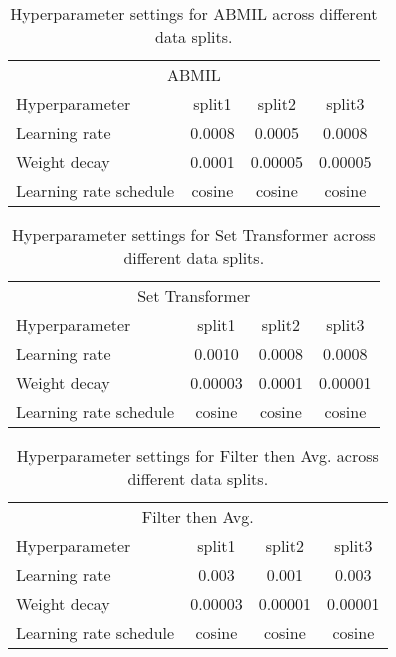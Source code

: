 \begin{table}[!htb]
\centering
\begin{tabular}{l|c|c|c}
\multicolumn{4}{c}{ABMIL} \\
Hyperparameter & split1 & split2 & split3 \\
\midrule
Learning rate & 0.0008 & 0.0005 & 0.0008 \\
Weight decay & 0.0001 & 0.00005 & 0.00005 \\
Learning rate schedule & cosine & cosine & cosine\\
\end{tabular}
\caption{Hyperparameter settings for ABMIL across different data splits.}
\label{tab:ABMIL_hyper}
\end{table}

\begin{table}[!htb]
\centering
\begin{tabular}{l|c|c|c}
\multicolumn{4}{c}{Set Transformer} \\
Hyperparameter & split1 & split2 & split3 \\
\midrule
Learning rate & 0.0010 & 0.0008 & 0.0008 \\
Weight decay & 0.00003 & 0.0001 & 0.00001 \\
Learning rate schedule & cosine & cosine & cosine\\
\end{tabular}
\caption{Hyperparameter settings for Set Transformer across different data splits.}
\label{tab:SetTransformer_hyper}
\end{table}


\begin{table}[!htb]
\centering
\begin{tabular}{l|c|c|c}
\multicolumn{4}{c}{Filter then Avg.} \\
Hyperparameter & split1 & split2 & split3 \\
\midrule
Learning rate & 0.003 & 0.001 & 0.003 \\
Weight decay & 0.00003 & 0.00001 & 0.00001 \\
Learning rate schedule & cosine & cosine & cosine\\
\end{tabular}
\caption{Hyperparameter settings for Filter then Avg. across different data splits.}
\label{tab:Filter then Avg._hyper}
\end{table}

